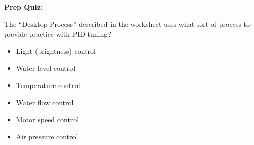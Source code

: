 












\vfil \eject

\noindent
{\bf Prep Quiz:}

The ``Desktop Process'' described in the worksheet uses what sort of process to provide practice with PID tuning?

\begin{itemize}
\item{} Light (brightness) control
\vskip 5pt 
\item{} Water level control
\vskip 5pt 
\item{} Temperature control
\vskip 5pt 
\item{} Water flow control
\vskip 5pt 
\item{} Motor speed control
\vskip 5pt 
\item{} Air pressure control
\end{itemize}





